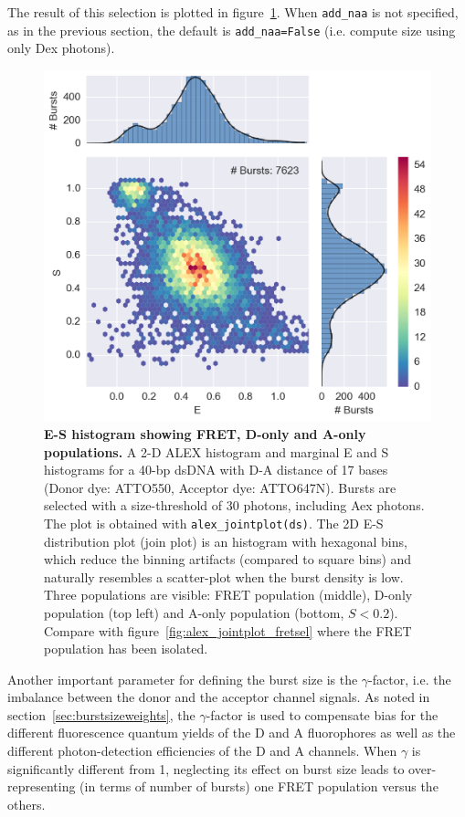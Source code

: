 \documentclass[10pt,letterpaper]{article}
\begin{document}
\noindent The result of this selection is plotted in figure~\ref{fig:alex_jointplot}.
When \verb|add_naa| is not specified,
as in the previous section, the default is \verb|add_naa=False|
(i.e. compute size using only Dex photons). 

\begin{figure}[h!]
\begin{center}
\includegraphics[width=0.7\columnwidth]{figures/alex_jointplot/alex_jointplot}
\caption{\label{fig:alex_jointplot} \textbf{E-S histogram showing FRET, D-only and A-only populations.}
A 2-D ALEX histogram and marginal E and S histograms for a 40-bp dsDNA 
with D-A distance of 17 bases (Donor dye: ATTO550, Acceptor dye: ATTO647N). 
Bursts are selected with a size-threshold of 30 photons, including Aex photons. 
The plot is obtained with \texttt{alex\_jointplot(ds)}. The 2D E-S distribution plot (join plot)
is an histogram with hexagonal bins, which reduce the binning artifacts (compared to square bins)
and naturally resembles a scatter-plot when the burst density is low.
Three populations are visible: FRET population (middle), D-only population (top left) and 
A-only population (bottom, $S < 0.2$). Compare with figure~\ref{fig:alex_jointplot_fretsel} 
where the FRET population has been isolated.%
}
\end{center}
\end{figure}


Another important parameter for defining the burst size is the $\gamma$-factor, i.e.
the imbalance between the donor and the acceptor channel signals. As noted in
section~\ref{sec:burstsizeweights}, the $\gamma$-factor is
used to compensate bias for the different fluorescence quantum yields of the D and A
fluorophores as well as the different photon-detection efficiencies of the D and A channels.
When $\gamma$ is significantly different from 1, neglecting its effect on burst size leads to
over-representing (in terms of number of bursts) one FRET population versus the others.
\end{document}
